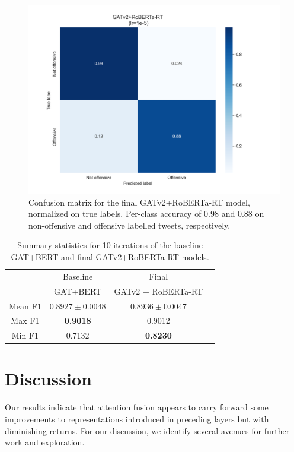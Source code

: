 \documentclass[letterpaper]{article} %
\begin{document}
\begin{figure}
    \includegraphics[width=\linewidth]{cm_final.png}
    \caption{Confusion matrix for the final GATv2+RoBERTa-RT model, normalized on true labels. Per-class accuracy of 0.98 and 0.88 on non-offensive and offensive labelled tweets, respectively.}
\end{figure}

\begin{table}
    \begin{tabular}{|c||c|c|c|}
        \hline
         & Baseline & Final  \\
         & GAT+BERT & GATv2 + RoBERTa-RT  \\
        \hline
        \hline 
        Mean F1  & $0.8927\pm0.0048$ & $\mathbf{0.8936 \pm 0.0047}$  \\
        Max F1 & \textbf{0.9018} & 0.9012 \\
        Min F1 & 0.7132 & \textbf{0.8230} \\
        \hline
    \end{tabular}
    \caption{Summary statistics for 10 iterations of the baseline GAT+BERT and final GATv2+RoBERTa-RT models.}
\end{table}

\section{Discussion}

Our results indicate that attention fusion appears to carry forward some improvements to representations introduced in preceding layers but with diminishing returns. For our discussion, we identify several avenues for further work and exploration. 
\end{document}
